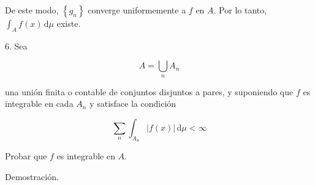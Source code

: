 \documentclass[fleqn]{article}
\begin{document}
	De este modo, $ \left\lbrace g_n \right\rbrace $ converge uniformemente a $ f $ en $A$. Por lo tanto, $ \int_{A} f(x) \, \mathrm{d} \mu $ existe.


	6. Sea 

	\begin{equation*}
		A = \bigcup_n A_n
	\end{equation*}

	una unión finita o contable de conjuntos disjuntos a pares, y suponiendo que $f$ es integrable en cada $ A_n $ y satisface la condición

	\begin{equation*}
		\sum_{n} \int_{A_n} | f(x) | \, \mathrm{d} \mu < \infty
	\end{equation*}

	Probar que $f$ es integrable en $A$.

	Demostración.
\end{document}
